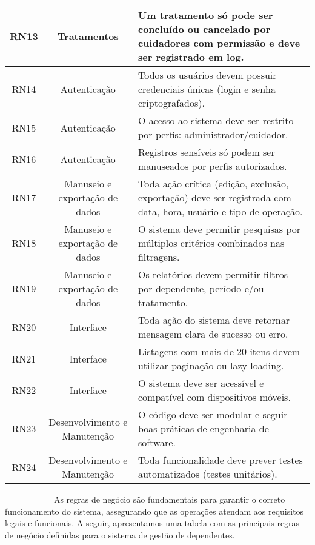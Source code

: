 \begin{quadro}
\begin{tabular}{|c|c|p{10cm}|}
        RN13   & Tratamentos                   & Um tratamento só pode ser concluído ou cancelado por cuidadores com permissão e deve ser registrado em log. \\ \hline
        RN14   & Autenticação                  & Todos os usuários devem possuir credenciais únicas (login e senha criptografados). \\ \hline
        RN15   & Autenticação                  & O acesso ao sistema deve ser restrito por perfis: administrador/cuidador. \\ \hline
        RN16   & Autenticação                  & Registros sensíveis só podem ser manuseados por perfis autorizados. \\ \hline
        RN17   & Manuseio e exportação de dados & Toda ação crítica (edição, exclusão, exportação) deve ser registrada com data, hora, usuário e tipo de operação. \\ \hline
        RN18   & Manuseio e exportação de dados & O sistema deve permitir pesquisas por múltiplos critérios combinados nas filtragens. \\ \hline
        RN19   & Manuseio e exportação de dados & Os relatórios devem permitir filtros por dependente, período e/ou tratamento. \\ \hline
        RN20   & Interface                    & Toda ação do sistema deve retornar mensagem clara de sucesso ou erro. \\ \hline
        RN21   & Interface                    & Listagens com mais de 20 itens devem utilizar paginação ou lazy loading. \\ \hline
        RN22   & Interface                    & O sistema deve ser acessível e compatível com dispositivos móveis. \\ \hline
        RN23   & Desenvolvimento e Manutenção & O código deve ser modular e seguir boas práticas de engenharia de software. \\ \hline
        RN24   & Desenvolvimento e Manutenção & Toda funcionalidade deve prever testes automatizados (testes unitários). \\ \hline
    \end{tabular}
=======
As regras de negócio são fundamentais para garantir o correto funcionamento do sistema, assegurando que as operações atendam aos requisitos legais e funcionais. A seguir, apresentamos uma tabela com as principais regras de negócio definidas para o sistema de gestão de dependentes.


\end{quadro}
